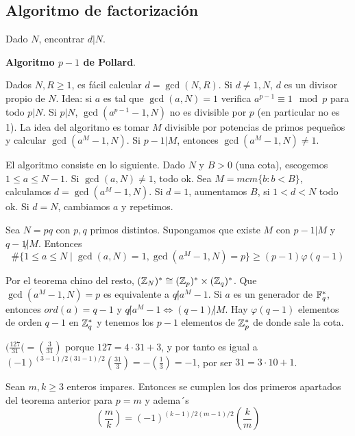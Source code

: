 \documentclass[CR.tex]{subfiles}
\begin{document}
\subsection{Algoritmo de factorización}
Dado $N$, encontrar $d|N$. 

\textbf{Algoritmo $p-1$ de Pollard}.

Dados $N,R\geq 1$, es fácil calcular $d=\gcd(N,R)$. Si $d\neq 1,N$, $d$ es un divisor propio de $N$. Idea: si $a$ es tal que $\gcd(a,N)=1$ verifica $a^{p-1}\equiv 1\mod p$ para todo $p|N$. Si $p|N$, $\gcd(a^{p-1}-1,N)$ no es divisible por $p$ (en particular no es 1). La idea del algoritmo es tomar $M$ divisible por potencias de primos pequeños y calcular $\gcd(a^M-1,N)$. Si $p-1|M$, entonces $\gcd(a^M-1,N)\neq 1$. 

El algoritmo consiste en lo siguiente. Dado $N$ y $B>0$ (una cota), escogemos $1\leq a\leq N-1$. Si $\gcd(a,N)\neq 1$, todo ok. Sea $M=mcm\{b:b<B\}$, calculamos $d=\gcd(a^M-1,N)$. Si $d=1$, aumentamos $B$, si $1<d<N$ todo ok. Si $d=N$, cambiamos $a$ y repetimos. 

\begin{prop}
Sea $N=pq$ con $p,q$ primos distintos. Supongamos que existe $M$ con $p-1|M$ y $q-1\not| M$. Entonces
\[
\#\{1\leq a\leq N\mid\gcd(a,N)=1, \gcd(a^M-1,N)=p\}\geq (p-1)\varphi(q-1)
\]
\end{prop}
\begin{dem}
Por el teorema chino del resto, $(\mathbb{Z}_N)^*\cong(\mathbb{Z}_p)^*\times(\mathbb{Z}_q)^*$. Que $\gcd(a^M-1,N)=p$ es equivalente a $q\not| a^M-1$. Si $a$ es un generador de $\mathbb{F}_q^*$, entonces $ord(a)=q-1$ y $q\not| a^M-1\Leftrightarrow (q-1)\not| M$. Hay $\varphi(q-1)$ elementos de orden $q-1$ en $\mathbb{Z}_q^*$ y tenemos los $p-1$ elementos de $\mathbb{Z}_p^*$ de donde sale la cota.
\end{dem}



\begin{ej}
$(\frac{127}{31}(=(\frac{3}{31})$ porque $127=4\cdot 31+3$, y por tanto es igual a $(-1)^{(3-1)/2 (31-1)/2}(\frac{31}{3})=-(\frac{1}{3})=-1$, por ser $31=3\cdot 10+1$.
\end{ej}

\begin{teorema}
Sean $m,k\geq 3$ enteros impares. Entonces se cumplen los dos primeros apartados del teorema anterior para $p=m$ y adema´s
\[
(\frac{m}{k})=(-1)^{(k-1)/2 (m-1)/2}(\frac{k}{m})
\]
\end{teorema}
\end{document}
